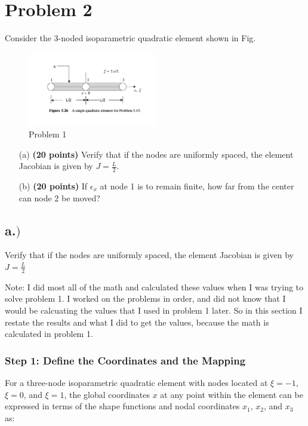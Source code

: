 \documentclass{article}
\begin{document}
\newpage
\section*{Problem 2}
Consider the 3-noded isoparametric quadratic element shown in Fig.

\begin{figure}[h!]
    \centering
    \includegraphics[width=0.5\textwidth]{figure_1.png}  %
    \caption{Problem 1}
    \label{fig:element}
\end{figure}

\begin{enumerate}
    \item[(a)] \textbf{(20 points)} Verify that if the nodes are uniformly spaced, the element Jacobian is given by \( J = \frac{L}{2} \).

    
    \item[(b)] \textbf{(20 points)} If \( \epsilon_x \) at node 1 is to remain finite, how far from the center can node 2 be moved?
 
\end{enumerate}


\subsection*{a.$)$}
 Verify that if the nodes are uniformly spaced, the element Jacobian is given by $J = \frac{L}{2}$

Note: I did most all of the math and calculated these values when I was trying to solve problem 1. I worked on the problems in order, and did not know that I would be calcuating the values that I used in problem 1 later. So in this section I restate the results and what
I did to get the values, because the math is calculated in problem 1.

\subsubsection*{Step 1: Define the Coordinates and the Mapping}
For a three-node isoparametric quadratic element with nodes located at \(\xi = -1\), \(\xi = 0\), and \(\xi = 1\), the global coordinates \( x \) at any point within the element can be expressed in terms of the shape functions and nodal coordinates \( x_1 \), \( x_2 \), and \( x_3 \) as:
\end{document}
